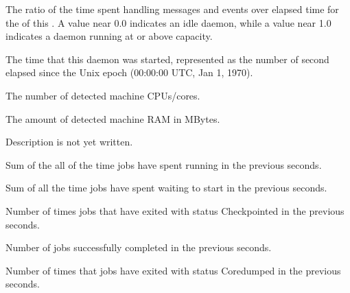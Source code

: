\begin{description}

\item[\AdAttr{DaemonCoreDutyCycle}:] The ratio of the time spent handling 
messages and events over elapsed time for the  of this .
  A value near 0.0 indicates an idle daemon, while a value near 1.0 indicates a daemon running at or above capacity.

\item[\AdAttr{DaemonStartTime}:] The time that this daemon was
  started, represented as the number of second elapsed since
    the Unix epoch (00:00:00 UTC, Jan 1, 1970).

\item[\AdAttr{DetectedCpus}:] The number of detected machine CPUs/cores.

\item[\AdAttr{DetectedMemory}:] The amount of detected machine RAM in MBytes.

\item[\AdAttr{JobQueueBirthdate}:] Description is not yet written.

\item[\AdAttr{JobsAccumRunningTime}:] Sum of the all of the time jobs have spent running
  in the previous  seconds.

\item[\AdAttr{JobsAccumTimeToStart}:] Sum of all the time jobs have spent waiting to start
  in the previous  seconds.

\item[\AdAttr{JobsCheckpointed}:] Number of times jobs that have exited with status Checkpointed
  in the previous  seconds.

\item[\AdAttr{JobsCompleted}:] Number of jobs successfully completed
  in the previous  seconds.

\item[\AdAttr{JobsCoredumped}:] Number of times that jobs have exited with status Coredumped
  in the previous  seconds.


\end{description}
